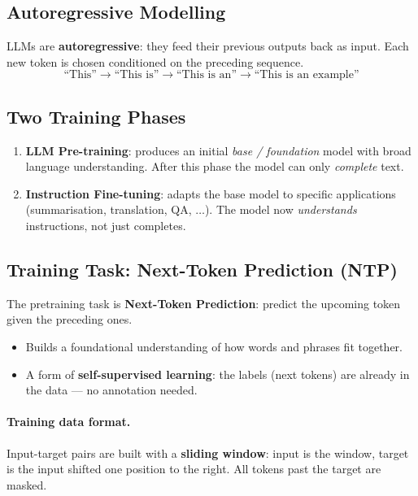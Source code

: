 \documentclass[11pt,a4paper]{article}
\theoremstyle{definition}
\theoremstyle{plain}
\theoremstyle{remark}
\begin{document}
\subsection{Autoregressive Modelling}

LLMs are \textbf{autoregressive}: they feed their previous outputs back as input. Each new token is chosen conditioned on the preceding sequence.
\[
    \text{``This''} \to \text{``This is''} \to \text{``This is an''} \to \text{``This is an example''}
\]

\subsection{Two Training Phases}

\begin{enumerate}
    \item \textbf{LLM Pre-training}: produces an initial \emph{base / foundation} model with broad language understanding. After this phase the model can only \emph{complete} text.
    \item \textbf{Instruction Fine-tuning}: adapts the base model to specific applications (summarisation, translation, QA, $\ldots$). The model now \emph{understands} instructions, not just completes.
\end{enumerate}

\subsection{Training Task: Next-Token Prediction (NTP)}

The pretraining task is \textbf{Next-Token Prediction}: predict the upcoming token given the preceding ones.
\begin{itemize}
    \item Builds a foundational understanding of how words and phrases fit together.
    \item A form of \textbf{self-supervised learning}: the labels (next tokens) are already in the data --- no annotation needed.
\end{itemize}

\paragraph{Training data format.} Input-target pairs are built with a \textbf{sliding window}: input is the window, target is the input shifted one position to the right. All tokens past the target are masked.
\end{document}
